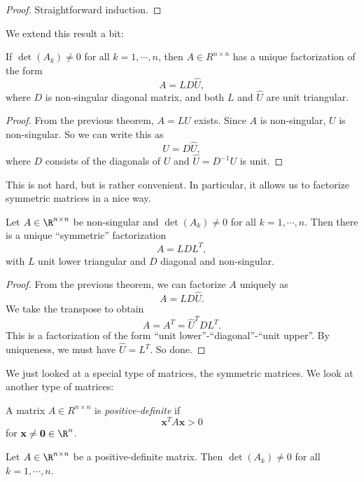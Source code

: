 \documentclass[a4paper]{article}
\begin{document}
\begin{proof}
  Straightforward induction. %
\end{proof}

We extend this result a bit:
\begin{thm}
  If $\det (A_k) \not= 0$ for all $k = 1, \cdots, n$, then $A \in R^{n \times n}$ has a unique factorization of the form
  \[
    A = LD \hat{U},
  \]
  where $D$ is non-singular diagonal matrix, and both $L$ and $\hat{U}$ are unit triangular.
\end{thm}

\begin{proof}
  From the previous theorem, $A = LU$ exists. Since $A$ is non-singular, $U$ is non-singular. So we can write this as
  \[
    U = D\hat{U},
  \]
  where $D$ consists of the diagonals of $U$ and $\hat{U} = D^{-1}U$ is unit.
\end{proof}
This is not hard, but is rather convenient. In particular, it allows us to factorize symmetric matrices in a nice way.

\begin{thm}
  Let $A \in \R^{n \times n}$ be non-singular and $\det(A_k) \not= 0$ for all $k = 1, \cdots, n$. Then there is a unique ``symmetric'' factorization
  \[
    A = LDL^T,
  \]
  with $L$ unit lower triangular and $D$ diagonal and non-singular.
\end{thm}

\begin{proof}
  From the previous theorem, we can factorize $A$ uniquely as
  \[
    A = LD\hat{U}.
  \]
  We take the transpose to obtain
  \[
    A = A^T = \hat{U}^T D L^T.
  \]
  This is a factorization of the form ``unit lower''-``diagonal''-``unit upper''. By uniqueness, we must have $\hat{U} = L^T$. So done.
\end{proof}

We just looked at a special type of matrices, the symmetric matrices. We look at another type of matrices:
\begin{defi}
  A matrix $A \in R^{n\times n}$ is \emph{positive-definite} if
  \[
    \mathbf{x}^T A\mathbf{x} > 0
  \]
  for $\mathbf{x}\not= \mathbf{0} \in \R^n$.
\end{defi}

\begin{thm}
  Let $A \in \R^{n\times n}$ be a positive-definite matrix. Then $\det(A_k) \not= 0$ for all $k = 1, \cdots, n$.
\end{thm}
\end{document}
